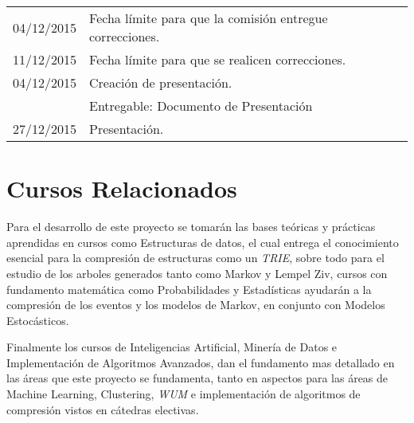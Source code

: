 \documentclass{udparticle}
\begin{document}
\begin{center}
\begin{tabular}{ll}
  		04/12/2015 & Fecha límite para que la comisión entregue correcciones.\\
  		11/12/2015 & Fecha límite para que se realicen correcciones.\\
  		
  		04/12/2015 & Creación de presentación.\\
  		& Entregable: Documento de Presentación  \\
  		27/12/2015 & Presentación.\\
  		
  		
  		\hline
  	\end{tabular}
  \end{center}


\section{Cursos Relacionados}

Para el desarrollo de este proyecto se tomarán las bases teóricas y prácticas aprendidas en cursos como Estructuras de datos, 
el cual entrega el conocimiento esencial  para la compresión de estructuras como un \emph{TRIE}, sobre todo para el estudio de los arboles generados 
tanto como Markov y Lempel Ziv, cursos con fundamento matemática como Probabilidades y Estadísticas ayudarán a la compresión de los eventos
y los modelos de Markov, en conjunto con Modelos Estocásticos. 

Finalmente los cursos de Inteligencias Artificial, Minería de Datos e Implementación de Algoritmos Avanzados, dan el fundamento mas detallado
en las áreas que este proyecto se fundamenta, tanto en aspectos para las áreas de Machine Learning, Clustering, \emph{WUM} e implementación de algoritmos de compresión
vistos en cátedras electivas.



  
% 


 
\end{document}
